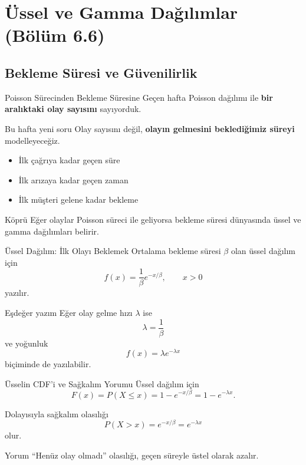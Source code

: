 \documentclass[light]{lutbeamer}
\begin{document}
\section{Üssel ve Gamma Dağılımlar (Bölüm 6.6)}
\subsection{Bekleme Süresi ve Güvenilirlik}

\begin{frame}{Poisson Sürecinden Bekleme Süresine}
    \small
    Geçen hafta Poisson dağılımı ile \textbf{bir aralıktaki olay sayısını} sayıyorduk.

    \begin{block}{Bu hafta yeni soru}
        Olay sayısını değil, \textbf{olayın gelmesini beklediğimiz süreyi} modelleyeceğiz.
    \end{block}

    \begin{itemize}
        \item İlk çağrıya kadar geçen süre
        \item İlk arızaya kadar geçen zaman
        \item İlk müşteri gelene kadar bekleme
    \end{itemize}

    \begin{alertblock}{Köprü}
        Eğer olaylar Poisson süreci ile geliyorsa bekleme süresi dünyasında üssel ve gamma dağılımları belirir.
    \end{alertblock}
\end{frame}

\begin{frame}{Üssel Dağılım: İlk Olayı Beklemek}
    \small
    Ortalama bekleme süresi \(\beta\) olan üssel dağılım için
    \[
    f(x)=\frac{1}{\beta}e^{-x/\beta}, \qquad x>0
    \]
    yazılır.

    \begin{block}{Eşdeğer yazım}
        Eğer olay gelme hızı \(\lambda\) ise
        \[
        \lambda=\frac{1}{\beta}
        \]
        ve yoğunluk
        \[
        f(x)=\lambda e^{-\lambda x}
        \]
        biçiminde de yazılabilir.
    \end{block}
\end{frame}

\begin{frame}{Üsselin CDF'i ve Sağkalım Yorumu}
    \small
    Üssel dağılım için
    \[
    F(x)=P(X\le x)=1-e^{-x/\beta}=1-e^{-\lambda x}.
    \]

    Dolayısıyla sağkalım olasılığı
    \[
    P(X>x)=e^{-x/\beta}=e^{-\lambda x}
    \]
    olur.

    \begin{alertblock}{Yorum}
        ``Henüz olay olmadı'' olasılığı, geçen süreyle üstel olarak azalır.
    \end{alertblock}
\end{frame}
\end{document}
